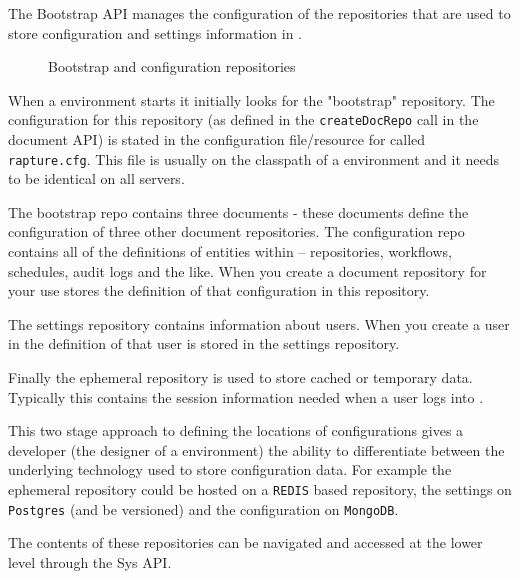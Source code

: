 The Bootstrap API manages the configuration of the repositories that are used to store
configuration and settings information in \Rapture.

\begin{figure}[H]
\centering
{}
\caption { Bootstrap and configuration repositories }
\end{figure}

When a \Rapture environment starts it initially looks for the "bootstrap" repository. The configuration for
this repository (as defined in the \verb+createDocRepo+ call in the document API) is stated in the
configuration file/resource for \Rapture called \verb+rapture.cfg+. This file is usually on the classpath of
a \Rapture environment and it needs to be identical on all \Rapture servers.

The bootstrap repo contains three documents - these documents define the configuration of three other
document repositories. The configuration repo contains all of the definitions of entities within \Rapture --
repositories, workflows, schedules, audit logs and the like. When you create a document repository for your use \Rapture
stores the definition of that configuration in this repository.

The settings repository contains information about users. When you create a user in \Rapture the definition of that
user is stored in the settings repository.

Finally the ephemeral repository is used to store cached or temporary data. Typically this contains the session information needed
when a user logs into \Rapture.

This two stage approach to defining the locations of configurations gives a developer (the designer of a \Rapture environment) the
ability to differentiate between the underlying technology used to store configuration data. For example the ephemeral repository could
be hosted on a \verb+REDIS+ based repository, the settings on \verb+Postgres+ (and be versioned) and the configuration on \verb+MongoDB+.

The contents of these repositories can be navigated and accessed at the lower level through the Sys API.
